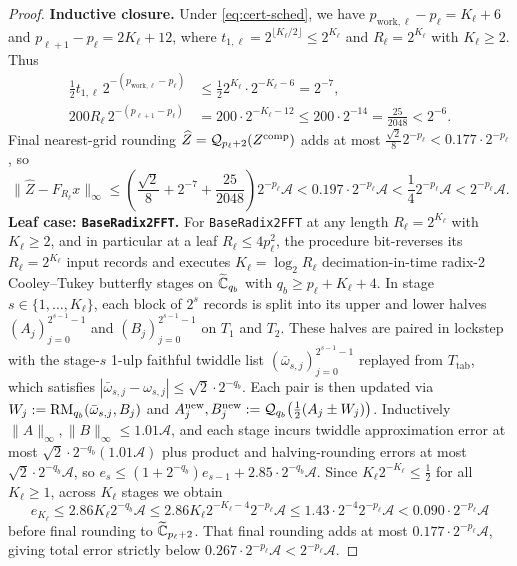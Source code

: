 \begin{proof}
\textbf{Inductive closure.}
Under \eqref{eq:cert-sched}, we have $p_{\mathrm{work},\ell} - p_\ell = K_\ell + 6$ and $p_{\ell+1} - p_\ell = 2 K_\ell + 12$, where $t_{1,\ell} = 2^{\lfloor K_\ell / 2 \rfloor} \le 2^{K_\ell}$ and $R_\ell = 2^{K_\ell}$ with $K_\ell \ge 2$. Thus
\[
  \begin{aligned}
    \frac{1}{2} t_{1,\ell} \, 2^{-(p_{\mathrm{work},\ell} - p_\ell)} &\le \frac{1}{2} 2^{K_\ell} \cdot 2^{-K_\ell - 6} = 2^{-7}, \\
    200 R_\ell \, 2^{-(p_{\ell+1} - p_\ell)} &= 200 \cdot 2^{-K_\ell - 12} \le 200 \cdot 2^{-14} = \frac{25}{2048} < 2^{-6}.
  \end{aligned}
\]
Final nearest-grid rounding $\widehat{Z} = \mathcal{Q}_{p_\ell + 2}(Z^{\mathrm{comp}})$ adds at most $\frac{\sqrt{2}}{8} 2^{-p_\ell} < 0.177 \cdot 2^{-p_\ell}$, so
\[
  \|\widehat{Z} - F_{R_\ell} x\|_\infty \le \left(\frac{\sqrt{2}}{8} + 2^{-7} + \frac{25}{2048}\right) 2^{-p_\ell} \mathcal{A} < 0.197 \cdot 2^{-p_\ell} \mathcal{A} < \frac{1}{4} 2^{-p_\ell} \mathcal{A} < 2^{-p_\ell} \mathcal{A}.
\]
\textbf{Leaf case: \texttt{BaseRadix2FFT}.}
For \texttt{BaseRadix2FFT} at any length $R_\ell = 2^{K_\ell}$ with $K_\ell \ge 2$, and in particular at a leaf $R_\ell \le 4 p_\ell^2$, the procedure bit-reverses its $R_\ell = 2^{K_\ell}$ input records and executes $K_\ell = \log_2 R_\ell$ decimation-in-time radix-2 Cooley--Tukey butterfly stages on $\widetilde{\mathbb{C}}_{q_b}$ with $q_b \ge p_\ell + K_\ell + 4$. In stage $s \in \{1, \dots, K_\ell\}$, each block of $2^s$ records is split into its upper and lower halves $(A_j)_{j=0}^{2^{s-1}-1}$ and $(B_j)_{j=0}^{2^{s-1}-1}$ on $T_1$ and $T_2$. These halves are paired in lockstep with the stage-$s$ 1-ulp faithful twiddle list $(\bar{\omega}_{s, j})_{j=0}^{2^{s-1}-1}$ replayed from $T_{\mathrm{tab}}$, which satisfies $|\bar{\omega}_{s, j} - \omega_{s, j}| \le \sqrt{2} \cdot 2^{-q_b}$. Each pair is then updated via $W_j := \operatorname{RM}_{q_b}(\bar{\omega}_{s, j}, B_j)$ and $A_j^{\mathrm{new}}, B_j^{\mathrm{new}} := \mathcal{Q}_{q_b}\bigl(\frac{1}{2}(A_j \pm W_j)\bigr)$. Inductively $\|A\|_\infty, \|B\|_\infty \le 1.01\mathcal{A}$, and each stage incurs twiddle approximation error at most $\sqrt{2} \cdot 2^{-q_b}(1.01\mathcal{A})$ plus product and halving-rounding errors at most $\sqrt{2} \cdot 2^{-q_b}\mathcal{A}$, so $e_s \le (1 + 2^{-q_b})e_{s-1} + 2.85 \cdot 2^{-q_b}\mathcal{A}$. Since $K_\ell 2^{-K_\ell} \le \frac{1}{2}$ for all $K_\ell \ge 1$, across $K_\ell$ stages we obtain
\[
  e_{K_\ell} \le 2.86 K_\ell 2^{-q_b} \mathcal{A} \le 2.86 K_\ell 2^{-K_\ell - 4} 2^{-p_\ell}\mathcal{A} \le 1.43 \cdot 2^{-4} 2^{-p_\ell}\mathcal{A} < 0.090 \cdot 2^{-p_\ell}\mathcal{A}
\]
before final rounding to $\widetilde{\mathbb{C}}_{p_\ell+2}$. That final rounding adds at most $0.177 \cdot 2^{-p_\ell}\mathcal{A}$, giving total error strictly below $0.267 \cdot 2^{-p_\ell}\mathcal{A} < 2^{-p_\ell}\mathcal{A}$.
\end{proof}


